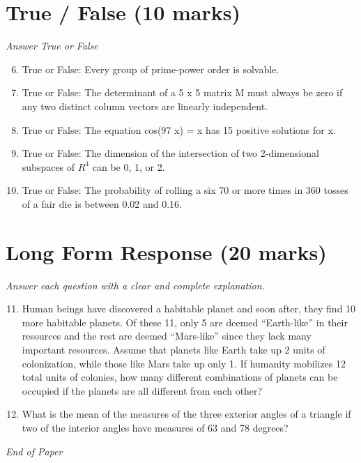 \documentclass[12pt]{article}
\begin{document}
\section*{True / False (10 marks)}
\textit{Answer True or False}
\begin{enumerate}[label=\arabic*.]
\setcounter{enumi}{5}
\item True or False: Every group of prime-power order is solvable.
\item True or False: The determinant of a 5 x 5 matrix M must always be zero if any two distinct column vectors are linearly independent.
\item True or False: The equation cos(97 x) = x has 15 positive solutions for x.
\item True or False: The dimension of the intersection of two 2-dimensional subspaces of $R^4$ can be 0, 1, or 2.
\item True or False: The probability of rolling a six 70 or more times in 360 tosses of a fair die is between 0.02 and 0.16.
\end{enumerate}

\section*{Long Form Response (20 marks)}
\textit{Answer each question with a clear and complete explanation.}
\begin{enumerate}[label=\arabic*.]
\setcounter{enumi}{10}
\item Human beings have discovered a habitable planet and soon after, they find 10 more habitable planets. Of these 11, only 5 are deemed ``Earth-like'' in their resources and the rest are deemed ``Mars-like'' since they lack many important resources. Assume that planets like Earth take up 2 units of colonization, while those like Mars take up only 1. If humanity mobilizes 12 total units of colonies, how many different combinations of planets can be occupied if the planets are all different from each other?
\item What is the mean of the measures of the three exterior angles of a triangle if two of the interior angles have measures of 63 and 78 degrees?
\end{enumerate}

\vfill
\noindent\textit{End of Paper}
\end{document}
